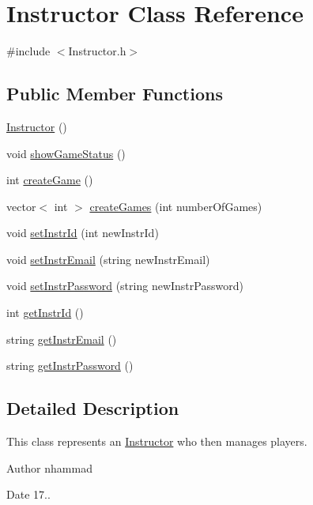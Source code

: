 \hypertarget{classInstructor}{}\section{Instructor Class Reference}
\label{classInstructor}


{\ttfamily \#include $<$Instructor.\+h$>$}

\subsection*{Public Member Functions}
\begin{DoxyCompactItemize}
\item 
\hyperlink{classInstructor_a7e4414cdb058703970bbcecf3a97046e}{Instructor} ()
\item 
void \hyperlink{classInstructor_ab92e047829e5977967071f812368b8b7}{show\+Game\+Status} ()
\item 
int \hyperlink{classInstructor_a9fca4b1272f062d14ffb5bb89b10b6f8}{create\+Game} ()
\item 
vector$<$ int $>$ \hyperlink{classInstructor_ab8aebf063f59482476c763eb635b9936}{create\+Games} (int number\+Of\+Games)
\item 
void \hyperlink{classInstructor_ae19bf0bec8343a445da507d8b0cbfbea}{set\+Instr\+Id} (int new\+Instr\+Id)
\item 
void \hyperlink{classInstructor_aa55caf448d54b03de5dd649260a20d5f}{set\+Instr\+Email} (string new\+Instr\+Email)
\item 
void \hyperlink{classInstructor_abbbe7c232169737566500946cfc52ec8}{set\+Instr\+Password} (string new\+Instr\+Password)
\item 
int \hyperlink{classInstructor_a7f9c4b2b1e3da3ca45d78a9f11a68fc0}{get\+Instr\+Id} ()
\item 
string \hyperlink{classInstructor_ac88389d0cff010143ef5a6367eee73f8}{get\+Instr\+Email} ()
\item 
string \hyperlink{classInstructor_a19a158a811281d5ad8b3c4850a94556d}{get\+Instr\+Password} ()
\end{DoxyCompactItemize}


\subsection{Detailed Description}
This class represents an \hyperlink{classInstructor}{Instructor} who then manages players.

\begin{DoxyAuthor}{Author}
nhammad 
\end{DoxyAuthor}
\begin{DoxyDate}{Date}
17.. 
\end{DoxyDate}


